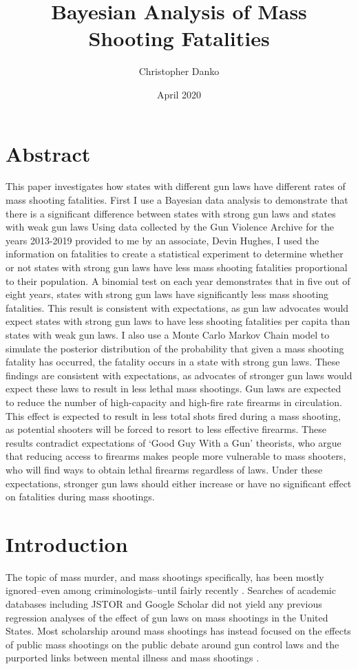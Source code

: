 \documentclass{article}
\title{Bayesian Analysis of Mass Shooting Fatalities}
\author{Christopher Danko}
\date{April 2020}
\begin{document}
\maketitle
\doublespacing

\section{Abstract}
This paper investigates how states with different gun laws have different rates of mass shooting fatalities. First I use a Bayesian data analysis to demonstrate that there is a significant difference between states with strong gun laws and states with weak gun laws  Using data collected by the Gun Violence Archive for the years 2013-2019 provided to me by an associate, Devin Hughes, I used the information on fatalities to create a statistical experiment to determine whether or not states with strong gun laws have less mass shooting fatalities proportional to their population. A binomial test on each year demonstrates that in five out of eight years, states with strong gun laws have significantly less mass shooting fatalities. This result is consistent with expectations, as gun law advocates would expect states with strong gun laws to have less shooting fatalities per capita than states with weak gun laws. I also use a Monte Carlo Markov Chain model to simulate the posterior distribution of the probability that given a mass shooting fatality has occurred, the fatality occurs in a state with strong gun laws. These findings are consistent with expectations, as advocates of stronger gun laws would expect these laws to result in less lethal mass shootings. Gun laws are expected to reduce the number of high-capacity and high-fire rate firearms in circulation. This effect is expected to result in less total shots fired during a mass shooting, as potential shooters will be forced to resort to less effective firearms. These results contradict expectations of ‘Good Guy With a Gun’ theorists, who argue that reducing access to firearms makes people more vulnerable to mass shooters, who will find ways to obtain lethal firearms regardless of laws. Under these expectations, stronger gun laws should either increase or have no significant effect on fatalities during mass shootings.

\section{Introduction}
The topic of mass murder, and mass shootings specifically, has been mostly ignored–even among criminologists–until fairly recently \cite{1}. Searches of academic databases including JSTOR and Google Scholar did not yield any previous regression analyses of the effect of gun laws on mass shootings in the United States. Most scholarship around mass shootings has instead focused on the effects of public mass shootings on the public debate around gun control laws \cite{2} and the purported links between mental illness and mass shootings \cite{3}.
\end{document}
